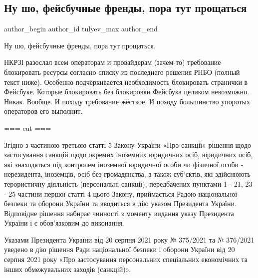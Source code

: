  
 
 
 
 
 
\subsection{Ну шо, фейсбучные френды, пора тут прощаться}
\label{sec:25_08_2021.fb.tulyev_max.1.facebook_blokirovka_rnbo}
 
\ifcmt
 author_begin
   author_id tulyev_max
 author_end
\fi

Ну шо, фейсбучные френды, пора тут прощаться.

НКРЗІ разослал всем операторам и провайдерам (зачем-то) требование блокировать
ресурсы согласно списку из последнего решения РНБО (полный текст ниже).
Особенно подчёркивается необходимость блокировать странички в Фейсбуке. Которые
блокировать без блокировки Фейсбука целиком невозможно. Никак. Вообще. И походу
требование жёсткое. И походу большинство упоротых операторов его выполнит.

=== cut ===

Згідно з частиною третьою статті 5 Закону України «Про санкції» рішення щодо
застосування санкцій щодо окремих іноземних юридичних осіб, юридичних осіб, які
знаходяться під контролем іноземної юридичної особи чи фізичної особи -
нерезидента, іноземців, осіб без громадянства, а також суб'єктів, які
здійснюють терористичну діяльність (персональні санкції), передбачених пунктами
1 - 21, 23 - 25 частини першої статті 4 цього Закону, приймається Радою
національної безпеки та оборони України та вводиться в дію указом Президента
України. Відповідне рішення набирає чинності з моменту видання указу Президента
України і є обов'язковим до виконання.

Указами Президента України від 20 серпня 2021 року № 375/2021 та № 376/2021
уведено в дію рішення Ради національної безпеки і оборони України від 20 серпня
2021 року «Про застосування персональних спеціальних економічних та інших
обмежувальних заходів (санкцій)». 


